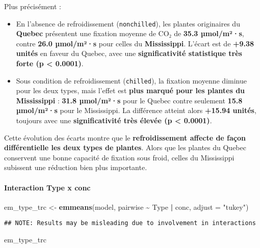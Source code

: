 \documentclass[
]{article}
\newenvironment{Shaded}{\begin{snugshade}}{\end{snugshade}}
\newcommand{\AttributeTok}[1]{\textcolor[rgb]{0.13,0.29,0.53}{#1}}
\newcommand{\FunctionTok}[1]{\textcolor[rgb]{0.13,0.29,0.53}{\textbf{#1}}}
\newcommand{\NormalTok}[1]{#1}
\newcommand{\OtherTok}[1]{\textcolor[rgb]{0.56,0.35,0.01}{#1}}
\newcommand{\SpecialCharTok}[1]{\textcolor[rgb]{0.81,0.36,0.00}{\textbf{#1}}}
\newcommand{\StringTok}[1]{\textcolor[rgb]{0.31,0.60,0.02}{#1}}
\begin{document}
Plus précisément :

\begin{itemize}
\item
  En l'absence de refroidissement (\texttt{nonchilled}), les plantes
  originaires du \textbf{Quebec} présentent une fixation moyenne de CO₂
  de \textbf{35.3 µmol/m²·s}, contre \textbf{26.0 µmol/m²·s} pour celles
  du \textbf{Mississippi}. L'écart est de \textbf{+9.38 unités} en
  faveur du Quebec, avec une \textbf{significativité statistique très
  forte (p \textless{} 0.0001)}.
\item
  Sous condition de refroidissement (\texttt{chilled}), la fixation
  moyenne diminue pour les deux types, mais l'effet est \textbf{plus
  marqué pour les plantes du Mississippi} : \textbf{31.8 µmol/m²·s} pour
  le Quebec contre seulement \textbf{15.8 µmol/m²·s} pour le
  Mississippi. La différence atteint alors \textbf{+15.94 unités},
  toujours avec une \textbf{significativité très élevée (p \textless{}
  0.0001)}.
\end{itemize}

Cette évolution des écarts montre que le \textbf{refroidissement affecte
de façon différentielle les deux types de plantes}. Alors que les
plantes du Quebec conservent une bonne capacité de fixation sous froid,
celles du Mississippi subissent une réduction bien plus importante.

\paragraph{Interaction Type x conc}\label{interaction-type-x-conc}

\begin{Shaded}
\begin{Highlighting}[]
\NormalTok{em\_type\_trc }\OtherTok{\textless{}{-}} \FunctionTok{emmeans}\NormalTok{(model, pairwise }\SpecialCharTok{\textasciitilde{}}\NormalTok{ Type }\SpecialCharTok{|}\NormalTok{ conc, }\AttributeTok{adjust =} \StringTok{"tukey"}\NormalTok{)}
\end{Highlighting}
\end{Shaded}

\begin{verbatim}
## NOTE: Results may be misleading due to involvement in interactions
\end{verbatim}

\begin{Shaded}
\begin{Highlighting}[]
\NormalTok{em\_type\_trc}
\end{Highlighting}
\end{Shaded}
\end{document}
